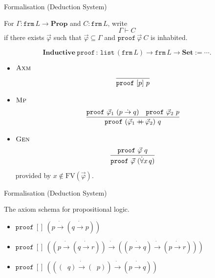 \documentclass[serif,table,10pt]{beamer}
\newcommand{\0}{\texttt{0}}
\newcommand{\1}{\texttt{1}}
\newcommand{\concat}{\ensuremath{+\!\!\!\!+\,}}
\newcommand{\Set}{\mathbf{Set}}
\newcommand{\Prop}{\mathbf{Prop}}
\newcommand{\FV}{\mathrm{FV}}
\newcommand{\proves}[2]{\mathtt{proof}\ #1\ #2 }
\newcommand{\listunit}[1]{[#1]}
\newcommand{\Lneg}{\mathop{\dot{\neg}}}
\newcommand{\Lto}{\mathrel{\dot{\to}}}
\newcommand{\Lall}[1]{\dot{\forall}#1\,}
\begin{document}
\begin{frame}{Formalisation (Deduction System)}

    For $ \Gamma : \mathtt{frm} \, L \to \Prop $ and $ C : \mathtt{frm} \, L $, write \[\Gamma \vdash C\] if there exists $ \vec\varphi $ such that $ \vec\varphi \subseteq \Gamma $ and $ \proves{\vec\varphi}{C} $ is inhabited.

    \[\mathbf{Inductive} \  \mathtt{proof} \, : \, \mathtt{list} \, ( \mathtt{frm} \, L ) \to \mathtt{frm} \, L \to \Set := \cdots . \]

    \begin{itemize}
        \item $\textsc{Axm}$ \[\infer{\proves{\listunit{p}}{p}}{}\]
        \item $\textsc{Mp}$ \[\infer{\proves{(\vec\varphi_1 \concat \vec\varphi_2)}{q}}{\proves{\vec\varphi_1}{(p \Lto q)} & \proves{\vec\varphi_2}{p}}\]
        \item $\textsc{Gen}$ \[\infer{\proves{\vec\varphi}{(\Lall{x} q)}}{\proves{\vec\varphi}{q}}\] provided by $ x \notin \FV ( \vec\varphi ) $.
    \end{itemize}

\end{frame}

\begin{frame}{Formalisation (Deduction System)}

    The axiom schema for propositional logic.

    \begin{itemize}
        \item $\proves{ \listunit{} }{ (p \Lto (q \Lto p)) }$
        \item $\proves{ \listunit{} }{ ((p \Lto (q \Lto r)) \Lto ((p \Lto q) \Lto (p \Lto r))) }$
        \item $\proves{ \listunit{} }{ (((\Lneg q) \Lto (\Lneg p)) \Lto (p \Lto q)) }$
    \end{itemize}
    
\end{frame}
\end{document}
